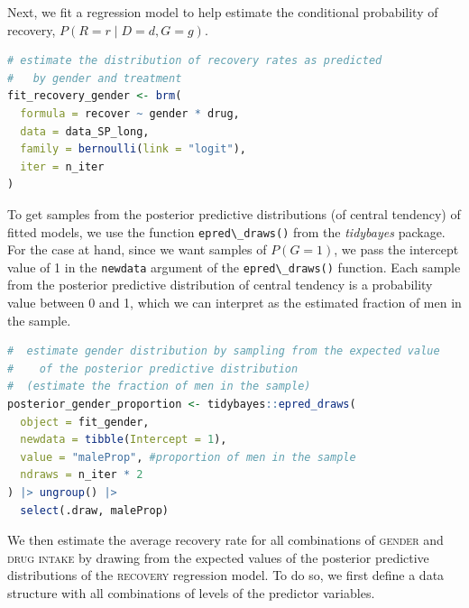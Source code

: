 \documentclass[nobib]{tufte-handout}
\newcommand{\ri}[1]{\mbox{\lstinline{#1}}\xspace}  %
\begin{document}
\vspace{-0.5cm}

Next, we fit a regression model to help estimate the conditional probability of recovery, $P\left(R = r \mid D=d, G=g \right)$.

\begin{minipage}[]{\textwidth}
\begin{lstlisting}[language=R]
# estimate the distribution of recovery rates as predicted
#   by gender and treatment
fit_recovery_gender <- brm(
  formula = recover ~ gender * drug,
  data = data_SP_long,
  family = bernoulli(link = "logit"),
  iter = n_iter
)
\end{lstlisting}
\end{minipage}

To get samples from the posterior predictive distributions (of central tendency) of fitted models, we use the function \ri{epred\_draws()} from the \textit{tidybayes} package.
For the case at hand, since we want samples of $P(G=1)$, we pass the intercept value of 1 in the \ri{newdata} argument of the \ri{epred\_draws()} function.
Each sample from the posterior predictive distribution of central tendency is a probability value between 0 and 1, which we can interpret as the estimated fraction of men in the sample.

\begin{minipage}[]{\textwidth}
\begin{lstlisting}[language=R]
#  estimate gender distribution by sampling from the expected value
#    of the posterior predictive distribution
#  (estimate the fraction of men in the sample)
posterior_gender_proportion <- tidybayes::epred_draws(
  object = fit_gender,
  newdata = tibble(Intercept = 1),
  value = "maleProp", #proportion of men in the sample
  ndraws = n_iter * 2
) |> ungroup() |>
  select(.draw, maleProp)
\end{lstlisting}
\end{minipage}

\vspace{-0.5cm}
We then estimate the average recovery rate for all combinations of \textsc{gender} and \textsc{drug intake} by drawing from the expected values of the posterior predictive distributions of the \textsc{recovery} regression model.
To do so, we first define a data structure with all combinations of levels of the predictor variables.
\end{document}
